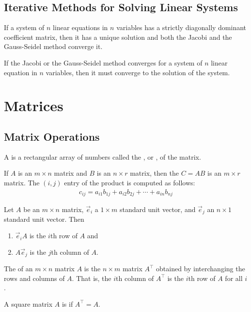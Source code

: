 \documentclass{article}
\begin{document}
\subsection{Iterative Methods for Solving Linear Systems}
\begin{theorem}
    If a system of $n$ linear equations in $n$ variables has a strictly diagonally dominant coefficient matrix, then it has a unique solution and both the Jacobi and the Gauss-Seidel method converge it.
\end{theorem}
\begin{theorem}
    If the Jacobi or the Gauss-Seidel method converges for a system of $n$ linear equation in $n$ variables, then it must converge to the solution of the system.
\end{theorem}
\section{Matrices}
\subsection{Matrix Operations}
\begin{definition}
    A  is a rectangular array of numbers called the , or , of the matrix.
\end{definition}
\begin{definition}
    If $A$ is an $m\times n$ matrix and $B$ is an $n\times r$ matrix, then the  $C=AB$ is an $m\times r$ matrix. The $(i, j)$ entry of the product is computed as follows:
    \begin{gather*}
        c_{ij} = a_{i1}b_{1j}+a_{i2}b_{2j}+\cdots+a_{in}b_{nj}
    \end{gather*}
\end{definition}
\begin{theorem}
    Let $A$ be an $m\times n$ matrix, $\vec e_i$ a $1\times m$ standard unit vector, and $\vec e_j$ an $n\times 1$ standard unit vector. Then
    \begin{enumerate}
        \item $\vec e_iA$ is the $i$th row of $A$ and
        \item $A\vec e_j$ is the $j$th column of $A$.
    \end{enumerate}
\end{theorem}
\begin{definition}
    The  of an $m\times n$ matrix $A$ is the $n\times m$ matrix $A^\intercal$ obtained by interchanging the rows and columns of $A$. That is, the $i$th column of $A^\intercal$ is the $i$th row of $A$ for all $i$.
\end{definition}
\begin{definition}
    A square matrix $A$ is  if $A^\intercal = A$.
\end{definition}
\end{document}
